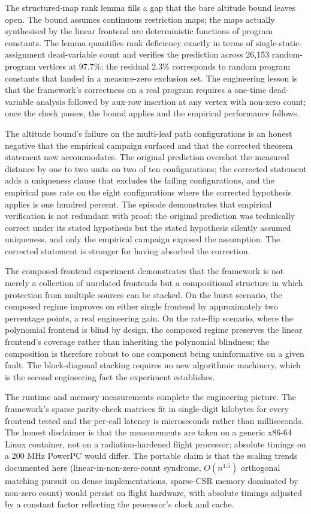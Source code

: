 \documentclass[12pt,a4paper]{article}
\theoremstyle{plain}
\theoremstyle{definition}
\begin{document}
The structured-map rank lemma fills a gap that the bare altitude bound leaves open. The bound assumes continuous restriction maps; the maps actually synthesised by the linear frontend are deterministic functions of program constants. The lemma quantifies rank deficiency exactly in terms of single-static-assignment dead-variable count and verifies the prediction across 26{,}153 random-program vertices at 97.7\%; the residual 2.3\% corresponds to random program constants that landed in a measure-zero exclusion set. The engineering lesson is that the framework's correctness on a real program requires a one-time dead-variable analysis followed by aux-row insertion at any vertex with non-zero count; once the check passes, the bound applies and the empirical performance follows.

The altitude bound's failure on the multi-leaf path configurations is an honest negative that the empirical campaign surfaced and that the corrected theorem statement now accommodates. The original prediction overshot the measured distance by one to two units on two of ten configurations; the corrected statement adds a uniqueness clause that excludes the failing configurations, and the empirical pass rate on the eight configurations where the corrected hypothesis applies is one hundred percent. The episode demonstrates that empirical verification is not redundant with proof: the original prediction was technically correct under its stated hypothesis but the stated hypothesis silently assumed uniqueness, and only the empirical campaign exposed the assumption. The corrected statement is stronger for having absorbed the correction.

The composed-frontend experiment demonstrates that the framework is not merely a collection of unrelated frontends but a compositional structure in which protection from multiple sources can be stacked. On the burst scenario, the composed regime improves on either single frontend by approximately two percentage points, a real engineering gain. On the rate-flip scenario, where the polynomial frontend is blind by design, the composed regime preserves the linear frontend's coverage rather than inheriting the polynomial blindness; the composition is therefore robust to one component being uninformative on a given fault. The block-diagonal stacking requires no new algorithmic machinery, which is the second engineering fact the experiment establishes.

The runtime and memory measurements complete the engineering picture. The framework's sparse parity-check matrices fit in single-digit kilobytes for every frontend tested and the per-call latency is microseconds rather than milliseconds. The honest disclaimer is that the measurements are taken on a generic x86-64 Linux container, not on a radiation-hardened flight processor; absolute timings on a 200 MHz PowerPC would differ. The portable claim is that the scaling trends documented here (linear-in-non-zero-count syndrome, $O(n^{1.5})$ orthogonal matching pursuit on dense implementations, sparse-CSR memory dominated by non-zero count) would persist on flight hardware, with absolute timings adjusted by a constant factor reflecting the processor's clock and cache.
\end{document}
